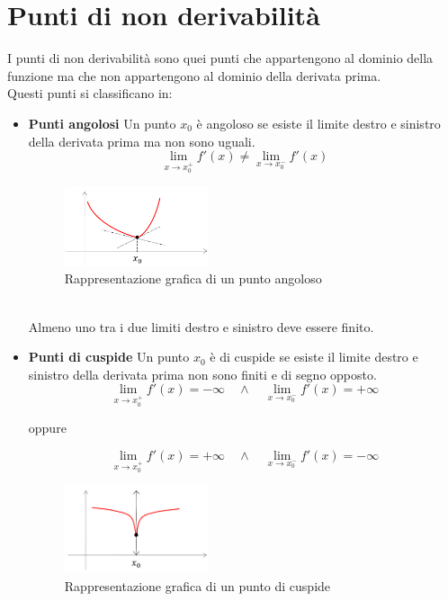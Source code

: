 \documentclass{article}
\begin{document}
\section*{Punti di non derivabilità}
I punti di non derivabilità sono quei punti che appartengono al dominio della funzione ma che non appartengono al dominio della derivata prima.\\
Questi punti si classificano in:
\begin{itemize}
\item \textbf{Punti angolosi} Un punto $x_0$ è angoloso se esiste il limite destro e sinistro della derivata prima ma non sono uguali.\\
\[
    \lim_{x \to x_0^+} f'(x) \neq \lim_{x \to x_0^-} f'(x)
\]
\begin{figure}[h]
    \centering
    \includegraphics[width=0.4\textwidth]{angoloso.png}
    \caption{Rappresentazione grafica di un punto angoloso}
\end{figure}\\
Almeno uno tra i due limiti destro e sinistro deve essere finito.
\newpage
\item \textbf{Punti di cuspide} Un punto $x_0$ è di cuspide se esiste il limite destro e sinistro della derivata prima non sono finiti e di segno opposto.\\
\[
    \lim_{x \to x_0^+} f'(x) = -\infty \quad \land \quad \lim_{x \to x_0^-} f'(x) = +\infty
\]
\begin{center}
    oppure
\end{center}
\[
    \lim_{x \to x_0^+} f'(x) = +\infty \quad \land \quad \lim_{x \to x_0^-} f'(x) = -\infty
\]
\begin{figure}[h]
\centering
\includegraphics[width=0.4\textwidth]{cuspide.png}
\caption{Rappresentazione grafica di un punto di cuspide}
\end{figure}\\

\end{itemize}
\end{document}
